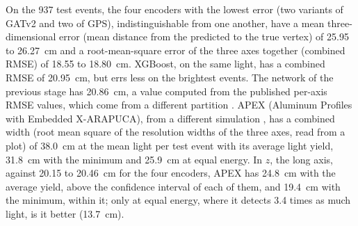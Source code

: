 On the \num{937} test events, the four encoders with the lowest error (two variants of GATv2 and two of GPS), indistinguishable from one another, have a mean three-dimensional error (mean distance from the predicted to the true vertex) of \num{25.95} to \qty{26.27}{\cm} and a root-mean-square error of the three axes together (combined RMSE) of \num{18.55} to \qty{18.80}{\cm}. XGBoost, on the same light, has a combined RMSE of \qty{20.95}{\cm}, but errs less on the brightest events. The network of the previous stage has \qty{20.86}{\cm}, a value computed from the published per-axis RMSE values, which come from a different partition \citep{vicentin2024study}. APEX (Aluminum Profiles with Embedded X-ARAPUCA), from a different simulation \citep{marinho2025apex}, has a combined width (root mean square of the resolution widths of the three axes, read from a plot) of \qty{38.0}{\cm} at the mean light per test event with its average light yield, \qty{31.8}{\cm} with the minimum and \qty{25.9}{\cm} at equal energy. In $z$, the long axis, against \num{20.15} to \qty{20.46}{\cm} for the four encoders, APEX has \qty{24.8}{\cm} with the average yield, above the confidence interval of each of them, and \qty{19.4}{\cm} with the minimum, within it; only at equal energy, where it detects \num{3.4} times as much light, is it better (\qty{13.7}{\cm}).
